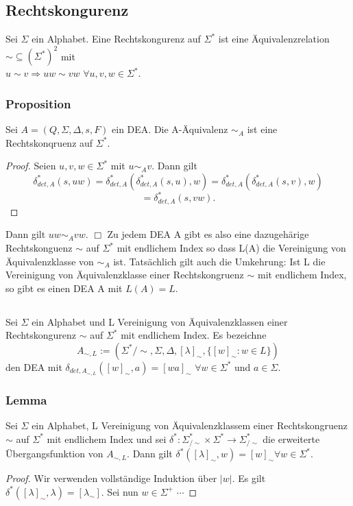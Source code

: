 \subsection{Rechtskongurenz}
    Sei \(\Sigma\) ein Alphabet. Eine Rechtskongurenz auf \(\Sigma^*\) ist eine Äquivalenzrelation
    \(\sim\subseteq(\Sigma^*)^2\) mit \\
    \(u\sim v\Rightarrow uw\sim vw\) \(\forall u,v,w\in\Sigma^*\).\par\bigskip
    \subsubsection*{Proposition}
    Sei $A = (Q, \Sigma, \Delta, s, F)$ ein DEA. Die A-Äquivalenz $\sim_{A}$ ist eine Rechtskonqruenz auf $\Sigma^{*}$.

        \begin{proof}
          Seien $u, v, w \in \Sigma^{*}$ mit $u \sim_{A} v$. Dann gilt 
          \[\delta_{det, A}^{*}(s, uw) = \delta_{det,A}^{*}(\delta_{det,A}^{*}(s, u), w) = \delta_{det,A}^{*}(\delta_{det,A}^{*}(s,v), w)\]
          \[= \delta_{det,A}^{*}(s, vw).\]    
        \end{proof} Dann gilt $uw\sim_{A}vw.$
        $\Box $
        Zu jedem DEA A gibt es also eine dazugehärige Rechtskonguenz $\sim$ auf $\Sigma^{*}$ mit endlichem Index so dass L(A) die Vereinigung von Äquivalenzklasse von $\sim_{A}$ ist. Tatsächlich gilt auch die Umkehrung: Ist L die Vereinigung von Äquivalenzklasse einer Rechtskongruenz $\sim$ mit endlichem Index, so gibt es einen DEA A mit $L(A) = L$.
\subsection{}
    Sei \(\Sigma\) ein Alphabet und L Vereinigung von Äquivalenzklassen einer Rechtskongurenz \(\sim\)
    auf \(\Sigma^*\) mit endlichem Index. Es bezeichne 
    \[A_{\sim,L}:=(\Sigma^*/{\sim},\Sigma,\Delta,[\lambda]_\sim,\{[w]_\sim:w\in L\})\]
    den DEA mit \(\delta_{det,A_{\sim,L}}([w]_\sim,a)=[wa]_\sim\) \(\forall w\in\Sigma^*\) und \(a\in\Sigma\).
    \subsubsection*{Lemma}
    Sei $\Sigma$ ein Alphabet, L Vereinigung von Äquivalenzklassem einer Rechtskongruenz $\sim$ auf $\Sigma^{*}$ mit endlichem Index und sei $\delta^{*} : \Sigma^{*}_{/\sim} \times \Sigma^{*} \rightarrow \Sigma^{*}_{/\sim}$ die erweiterte Übergangsfunktion von $A_{\sim, L}$. Dann gilt $\delta^{*}([\lambda]_{\sim}, w) = [w]_{\sim} \forall w \in \Sigma^{*}$. 
\begin{proof}
  Wir verwenden vollständige Induktion über $|w|$. Es gilt $\delta^{*}([\lambda]_{\sim}, \lambda) = [\lambda_{\sim}]$. Sei nun $w \in \Sigma^{+}$ $\cdots$  
\end{proof}

